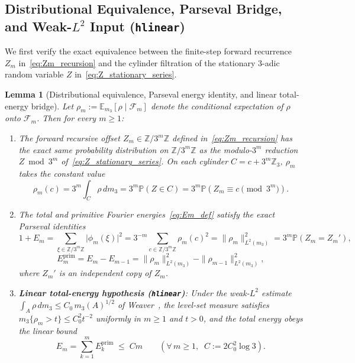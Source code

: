 \documentclass[11pt,a4paper]{article}
\numberwithin{equation}{section}
\newtheorem{lemma}[theorem]{Lemma}
\theoremstyle{definition}
\theoremstyle{remark}
\newcommand{\Z}{\mathbb{Z}}
\newcommand{\E}{\mathbb{E}}
\renewcommand{\P}{\mathbb{P}}
\newcommand{\cF}{\mathcal{F}}
\newcommand{\prim}{\mathrm{prim}}
\begin{document}
\subsection{Distributional Equivalence, Parseval Bridge, and Weak-$L^2$ Input (\texttt{hlinear})}\label{subsec:local_density}

We first verify the exact equivalence between the finite-step forward recurrence $Z_m$ in~\eqref{eq:Zm_recursion} and the cylinder filtration of the stationary $3$-adic random variable $Z$ in~\eqref{eq:Z_stationary_series}.

\begin{lemma}[Distributional equivalence, Parseval energy identity, and linear total-energy bridge]\label{lem:parseval_linear_bridge}
Let $\rho_m := \E_{m_3}[\rho \mid \cF_m]$ denote the conditional expectation of $\rho$ onto $\cF_m$. Then for every $m \ge 1$:
\begin{enumerate}[label=(\arabic*),topsep=2pt,itemsep=2pt]
\item The forward recursive offset $Z_m \in \Z/3^m\Z$ defined in~\eqref{eq:Zm_recursion} has the exact same probability distribution on $\Z/3^m\Z$ as the modulo-$3^m$ reduction $Z \bmod 3^m$ of~\eqref{eq:Z_stationary_series}. On each cylinder $C = c + 3^m\Z_3$, $\rho_m$ takes the constant value
\[
 \rho_m(c) = 3^m \int_C \rho\,dm_3 = 3^m \P(Z \in C) = 3^m \P(Z_m \equiv c \pmod{3^m}).
\]
\item The total and primitive Fourier energies~\eqref{eq:Em_def} satisfy the exact Parseval identities
\begin{equation}\label{eq:parseval_detail}
 1 + E_m = \sum_{\xi \in \Z/3^m\Z} \bigl|\phi_m(\xi)\bigr|^2 = 3^{-m}\sum_{c \in \Z/3^m\Z} \rho_m(c)^2 = \|\rho_m\|_{L^2(m_3)}^2 = 3^m \P(Z_m = Z_m'),
\end{equation}
\begin{equation}\label{eq:Eprim_L2_increment}
 E_m^{\prim} = E_m - E_{m-1} = \|\rho_m\|_{L^2(m_3)}^2 - \|\rho_{m-1}\|_{L^2(m_3)}^2,
\end{equation}
where $Z_m'$ is an independent copy of $Z_m$.
\item \textbf{Linear total-energy hypothesis (\texttt{hlinear})}: Under the weak-$L^2$ estimate $\int_A \rho\,dm_3 \le C_0\,m_3(A)^{1/2}$ of Weaver~\cite[\S\S 2--7]{Weaver2026}, the level-set measure satisfies $m_3\{\rho_m > t\} \le C_0^2 t^{-2}$ uniformly in $m \ge 1$ and $t > 0$, and the total energy obeys the linear bound
\begin{equation}\label{eq:linear_Em_bridge}
 E_m = \sum_{k=1}^m E_k^{\prim} \;\le\; C m \qquad (\forall\, m \ge 1,\;\; C := 2 C_0^2 \log 3).
\end{equation}
\end{enumerate}
\end{lemma}
\end{document}
